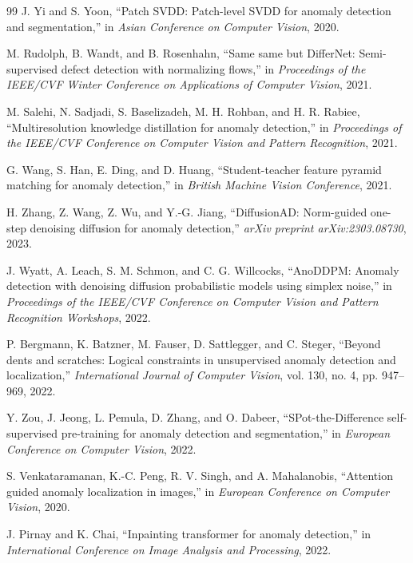 \documentclass[10pt,conference]{IEEEtran}
\begin{document}
\begin{thebibliography}{99}
J. Yi and S. Yoon, ``Patch SVDD: Patch-level SVDD for anomaly detection
and segmentation,'' in \emph{Asian Conference on Computer Vision}, 2020.

M. Rudolph, B. Wandt, and B. Rosenhahn, ``Same same but DifferNet:
Semi-supervised defect detection with normalizing flows,'' in
\emph{Proceedings of the IEEE/CVF Winter Conference on Applications of
Computer Vision}, 2021.

M. Salehi, N. Sadjadi, S. Baselizadeh, M. H. Rohban, and H. R. Rabiee,
``Multiresolution knowledge distillation for anomaly detection,'' in
\emph{Proceedings of the IEEE/CVF Conference on Computer Vision and Pattern
Recognition}, 2021.

G. Wang, S. Han, E. Ding, and D. Huang, ``Student-teacher feature pyramid
matching for anomaly detection,'' in \emph{British Machine Vision
Conference}, 2021.

H. Zhang, Z. Wang, Z. Wu, and Y.-G. Jiang, ``DiffusionAD: Norm-guided
one-step denoising diffusion for anomaly detection,'' \emph{arXiv preprint
arXiv:2303.08730}, 2023.

J. Wyatt, A. Leach, S. M. Schmon, and C. G. Willcocks, ``AnoDDPM: Anomaly
detection with denoising diffusion probabilistic models using simplex
noise,'' in \emph{Proceedings of the IEEE/CVF Conference on Computer Vision
and Pattern Recognition Workshops}, 2022.

P. Bergmann, K. Batzner, M. Fauser, D. Sattlegger, and C. Steger, ``Beyond
dents and scratches: Logical constraints in unsupervised anomaly detection
and localization,'' \emph{International Journal of Computer Vision},
vol. 130, no. 4, pp. 947--969, 2022.

Y. Zou, J. Jeong, L. Pemula, D. Zhang, and O. Dabeer, ``SPot-the-Difference
self-supervised pre-training for anomaly detection and segmentation,'' in
\emph{European Conference on Computer Vision}, 2022.

S. Venkataramanan, K.-C. Peng, R. V. Singh, and A. Mahalanobis,
``Attention guided anomaly localization in images,'' in \emph{European
Conference on Computer Vision}, 2020.

J. Pirnay and K. Chai, ``Inpainting transformer for anomaly detection,''
in \emph{International Conference on Image Analysis and Processing}, 2022.


\end{thebibliography}
\end{document}
